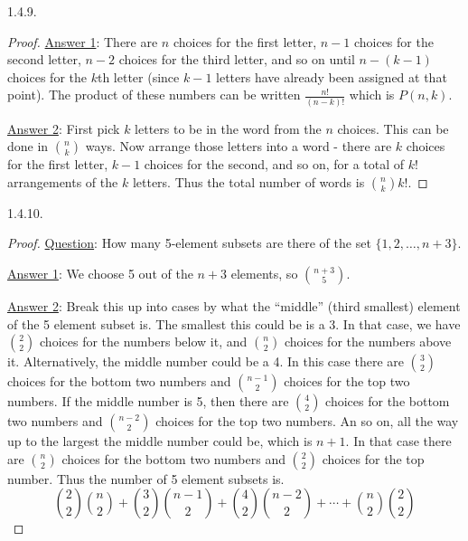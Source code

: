 \begin {itemize}
\begin{ans}{1.4.9.}
\begin{proof}
         \underline{Answer 1}: There are $n$ choices for the first letter, $n-1$ choices for the second letter, $n-2$ choices for the third letter, and so on until $n - (k-1)$ choices for the $k$th letter (since $k-1$ letters have already been assigned at that point).  The product of these numbers can be written $\frac{n!}{(n-k)!}$ which is $P(n,k)$.

         \underline{Answer 2}: First pick $k$ letters to be in the word from the $n$ choices.  This can be done in ${n \choose k}$ ways.  Now arrange those letters into a word - there are $k$ choices for the first letter, $k-1$ choices for the second, and so on, for a total of $k!$ arrangements of the $k$ letters.  Thus the total number of words is ${n \choose k}k!$.
        \end{proof}
	
\end{ans}
\begin{ans}{1.4.10.}
		\begin{proof}
		\underline{Question}: How many 5-element subsets are there of the set $\{1,2,\ldots, n+3\}$.

		\underline{Answer 1}: We choose 5 out of the $n+3$ elements, so ${n+3 \choose 5}$.

		\underline{Answer 2}: Break this up into cases by what the ``middle'' (third smallest) element of the 5 element subset is.  The smallest this could be is a 3.  In that case, we have ${2 \choose 2}$ choices for the numbers below it, and ${n \choose 2}$ choices for the numbers above it.  Alternatively, the middle number could be a 4.  In this case there are ${3 \choose 2}$ choices for the bottom two numbers and ${n-1 \choose 2}$ choices for the top two numbers.  If the middle number is 5, then there are ${4 \choose 2}$ choices for the bottom two numbers and ${n-2 \choose 2}$ choices for the top two numbers.  An so on, all the way up to the largest the middle number could be, which is $n+1$.  In that case there are ${n \choose 2}$ choices for the bottom two numbers and ${2 \choose 2}$ choices for the top number.  Thus the number of 5 element subsets is.
		\[{2 \choose 2}{n \choose 2} + {3 \choose 2}{n-1 \choose 2} + {4\choose 2}{n-2 \choose 2} + \cdots + {n\choose 2}{2\choose 2}\]
		\end{proof}
	
\end{ans}
\protect \end {itemize}

